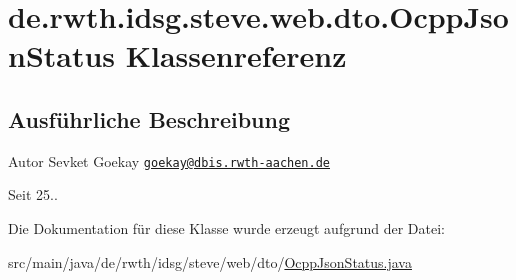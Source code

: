 \hypertarget{classde_1_1rwth_1_1idsg_1_1steve_1_1web_1_1dto_1_1_ocpp_json_status}{\section{de.\+rwth.\+idsg.\+steve.\+web.\+dto.\+Ocpp\+Json\+Status Klassenreferenz}
\label{classde_1_1rwth_1_1idsg_1_1steve_1_1web_1_1dto_1_1_ocpp_json_status}
}


\subsection{Ausführliche Beschreibung}
\begin{DoxyAuthor}{Autor}
Sevket Goekay \href{mailto:goekay@dbis.rwth-aachen.de}{\tt goekay@dbis.\+rwth-\/aachen.\+de} 
\end{DoxyAuthor}
\begin{DoxySince}{Seit}
25.. 
\end{DoxySince}


Die Dokumentation für diese Klasse wurde erzeugt aufgrund der Datei\+:\begin{DoxyCompactItemize}
\item 
src/main/java/de/rwth/idsg/steve/web/dto/\hyperlink{_ocpp_json_status_8java}{Ocpp\+Json\+Status.\+java}\end{DoxyCompactItemize}
